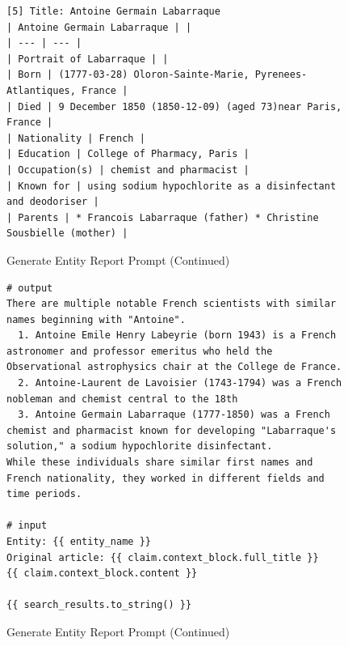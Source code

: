 \begin{figure}[htb]
\begin{lstlisting}
[5] Title: Antoine Germain Labarraque
| Antoine Germain Labarraque | |
| --- | --- |
| Portrait of Labarraque | |
| Born | (1777-03-28) Oloron-Sainte-Marie, Pyrenees-Atlantiques, France |
| Died | 9 December 1850 (1850-12-09) (aged 73)near Paris, France |
| Nationality | French |
| Education | College of Pharmacy, Paris |
| Occupation(s) | chemist and pharmacist |
| Known for | using sodium hypochlorite as a disinfectant and deodoriser |
| Parents | * Francois Labarraque (father) * Christine Sousbielle (mother) |
\end{lstlisting}

\caption{Generate Entity Report Prompt (Continued)} \label{lst:generate_entity_report_2}
\end{figure}

\begin{figure}[htb]
\begin{lstlisting}
# output
There are multiple notable French scientists with similar names beginning with "Antoine".
  1. Antoine Emile Henry Labeyrie (born 1943) is a French astronomer and professor emeritus who held the Observational astrophysics chair at the College de France.
  2. Antoine-Laurent de Lavoisier (1743-1794) was a French nobleman and chemist central to the 18th
  3. Antoine Germain Labarraque (1777-1850) was a French chemist and pharmacist known for developing "Labarraque's solution," a sodium hypochlorite disinfectant.
While these individuals share similar first names and French nationality, they worked in different fields and time periods.

# input
Entity: {{ entity_name }}
Original article: {{ claim.context_block.full_title }}
{{ claim.context_block.content }}

{{ search_results.to_string() }}
\end{lstlisting}

\caption{Generate Entity Report Prompt (Continued)} \label{lst:generate_entity_report_3}
\end{figure}


